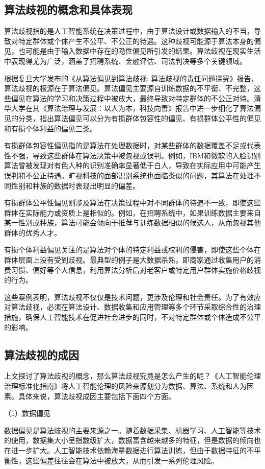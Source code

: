 \subsection{算法歧视的概念和具体表现}
算法歧视指的是人工智能系统在决策过程中，由于算法设计或数据输入的不当，导致对特定群体或个体产生不公平、不公正的待遇。这种歧视可能源于算法本身的偏见，也可能是由于输入数据中存在的隐性偏见所引发的结果。算法歧视在现实生活中表现得尤为广泛，涵盖了招聘系统、金融评估、司法判决等多个关键领域。

根据复旦大学发布的《从算法偏见到算法歧视: 算法歧视的责任问题探究》报告，算法歧视的根源在于算法偏见。算法偏见主要源自训练数据的不平衡、不完整，这些偏见在算法的学习和决策过程中被放大，最终导致对特定群体的不公正对待。清华大学在其《算法治理与发展：以人为本，科技向善》报告中进一步细化了算法偏见的分类，指出算法偏见可以分为有损群体包容性的偏见、有损群体公平性的偏见和有损个体利益的偏见三类。

有损群体包容性偏见指的是算法在处理数据时，对某些群体的数据覆盖不足或代表性不强，导致这些群体在算法决策中被忽视或误判。例如，IBM和微软的人脸识别算法曾被发现对有色人种的识别准确率显著低于白人，导致在实际应用中可能产生误判和不公正待遇。旷视科技的面部识别系统也面临类似的问题，其算法在处理不同性别和种族的数据时表现出明显的偏差。

有损群体公平性偏见则涉及算法在决策过程中对不同群体的待遇不一致，即使这些群体在实际能力或资质上是相似的。例如，在招聘系统中，如果训练数据主要来自某一性别或种族，算法可能会倾向于推荐与训练数据相似的候选人，从而忽视其他群体的优秀人才。

有损个体利益偏见关注的是算法对个体的特定利益或权利的侵害，即使这些个体在群体层面上没有受到歧视。最典型的例子是大数据杀熟，即商家通过收集用户的消费习惯、偏好等个人信息，利用算法分析后对老客户或特定用户群体实施价格歧视的行为。

这些案例表明，算法歧视不仅仅是技术问题，更涉及伦理和社会责任。为了有效应对算法歧视，必须在算法设计、数据收集和应用管理等多个环节采取综合性的治理措施，确保人工智能技术在促进社会进步的同时，不对特定群体或个体造成不公平的影响。
\subsection{算法歧视的成因}
上文探讨了算法歧视的概念，那么算法歧视究竟是怎么产生的呢？《人工智能伦理治理标准化指南》将人工智能伦理的风险来源划分为数据、算法、系统和人为因素。具体来说，算法歧视成因主要包括下面四个方面。

（1）数据偏见

数据偏见是算法歧视的主要来源之一。随着数据采集、机器学习、人工智能等技术的使用，数据集大小呈指数级扩大，数据富含越来越多的特征，但是数据的倾向也在进一步扩大。人工智能技术依赖海量数据进行算法训练，但由于数据特征的不平衡性，这些偏差往往会在算法中被放大，从而引发一系列伦理风险。

